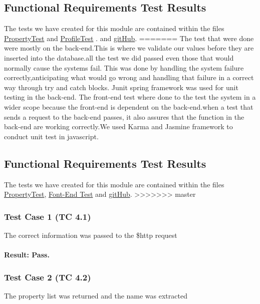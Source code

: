 \documentclass[a4paper,12pt]{article}
\begin{document}
\begin{itemize}
\subsection{Functional Requirements Test Results}
The tests we have created for this module are contained within the files   \href{https://github.com/u13278012/IMPAKD/blob/master/Implementation/PIO/BackEnd/test/Test/PropertyTest.java}{PropertyTest} and  \href{https://github.com/u13278012/IMPAKD/blob/master/Implementation/PIO/BackEnd/test/Test/ProfileTest.java}{ProfileTest} . and \href{https://github.com/u13278012/IMPAKD/}{gitHub}.
=======
The test that were done were mostly on the back-end.This is where we validate our values before they are inserted into the database.all the test we did passed even those that would normally cause the systems fail. This was done by handling the system failure correctly,anticipating what would go wrong and handling that failure in a correct way through try and catch blocks. Junit spring framework was used for unit testing in the back-end. The front-end test where done to the test the system in a wider scope because the front-end is dependent on the back-end.when a test that sends a request to the back-end passes, it also assures that the function in the back-end are working correctly.We used Karma and Jasmine framework to conduct unit test in javascript.

\subsection{Functional Requirements Test Results}
The tests we have created for this module are contained within the files   \href{https://github.com/u13278012/IMPAKD/blob/master/Implementation/PIO/BackEnd/test/Test/PropertyTest.java}{PropertyTest}, \href{https://github.com/u13278012/IMPAKD/blob/master/Implementation/PIO/FrontEnd/app/addProperty/addProperty_test.js}{Font-End Test} and \href{https://github.com/u13278012/IMPAKD/}{gitHub}.
>>>>>>> master

\subsubsection{Test Case 1 (TC 4.1)}
The correct information was passed to the \$http request
\paragraph{Result: Pass.}

\subsubsection{Test Case 2 (TC 4.2)}
The property list was returned and the name was extracted

\end{itemize}
\end{document}

